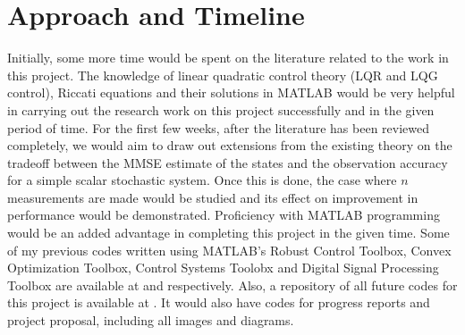 \documentclass[a4paper,12pt]{article}
\begin{document}
\section{Approach and Timeline}
Initially, some more time would be spent on the literature related to the work in this project. The knowledge of linear quadratic control theory (LQR and LQG control), Riccati equations and their solutions in MATLAB would be very helpful in carrying out the research work on this project successfully and in the given period of time. For the first few weeks, after the literature has been reviewed completely, we would aim to draw out extensions from the existing theory on the tradeoff between the MMSE estimate of the states and the observation accuracy for a simple scalar stochastic system. Once this is done, the case where $n$ measurements are made would be studied and its effect on improvement in performance would be demonstrated. Proficiency with MATLAB programming would be an added advantage in completing this project in the given time. Some of my previous codes written using MATLAB's Robust Control Toolbox, Convex Optimization Toolbox, Control Systems Toolobx and Digital Signal Processing Toolbox are available at \cite{git_rct} and \cite{git_dac} respectively. Also, a repository of all future codes for this project is available at \cite{git}. It would also have codes for progress reports and project proposal, including all images and diagrams.

\printbibliography
     
\end{document}
